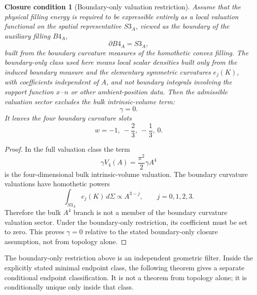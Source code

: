 \documentclass[11pt,a4paper]{article}
\def\Bfour{B4}%
\def\Sthree{S3}%
\def\dd{d}%
\numberwithin{equation}{section}
\newtheorem{closurecondition}[criterion]{Closure condition}
\theoremstyle{remark}
\newcommand{\Sthree}{S^3}
\newcommand{\Bfour}{B^4}
\newcommand{\dd}{\mathrm{d}}
\begin{document}
\begin{closurecondition}[Boundary-only valuation restriction]
Assume that the physical filling energy is required to be expressible entirely as a local valuation functional on the spatial representative \(\Sthree_A\), viewed as the boundary of the auxiliary filling \(\Bfour_A\),
\begin{equation}
\partial\Bfour_A=\Sthree_A,
\end{equation}
built from the boundary curvature measures of the homothetic convex filling. The boundary-only class used here means local scalar densities built only from the induced boundary measure and the elementary symmetric curvatures \(e_j(K)\), with coefficients independent of \(A\), and not boundary integrals involving the support function \(x\cdot n\) or other ambient-position data. Then the admissible valuation sector excludes the bulk intrinsic-volume term:
\begin{equation}
\gamma=0.
\end{equation}
It leaves the four boundary curvature slots
\begin{equation}
w=-1,\ -\frac{2}{3},\ -\frac{1}{3},\ 0.
\end{equation}
\end{closurecondition}
\begin{proof}
In the full valuation class the term
\begin{equation}
\gamma V_4(A)=\frac{\pi^2}{2}\gamma A^4
\end{equation}
is the four-dimensional bulk intrinsic-volume valuation. The boundary curvature valuations have homothetic powers
\begin{equation}
\int_{\Sthree_A}e_j(K)\,\dd\Sigma\propto A^{3-j},
\qquad j=0,1,2,3.
\end{equation}
Therefore the bulk \(A^4\) branch is not a member of the boundary curvature valuation sector. Under the boundary-only restriction, its coefficient must be set to zero. This proves \(\gamma=0\) relative to the stated boundary-only closure assumption, not from topology alone.
\end{proof}


The boundary-only restriction above is an independent geometric filter. Inside the explicitly stated minimal endpoint class, the following theorem gives a separate conditional endpoint classification. It is not a theorem from topology alone; it is conditionally unique only inside that class.
\end{document}
